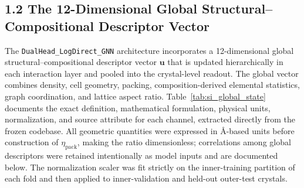 \documentclass[journal,article,submit,moreauthors,pdftex]{article}
\begin{document}
\subsection*{1.2 The 12-Dimensional Global Structural--Compositional Descriptor Vector}
The \texttt{DualHead\_LogDirect\_GNN} architecture incorporates a 12-dimensional global structural--compositional descriptor vector $\mathbf{u}$ that is updated hierarchically in each interaction layer and pooled into the crystal-level readout. The global vector combines density, cell geometry, packing, composition-derived elemental statistics, graph coordination, and lattice aspect ratio. Table~\ref{tab:si_global_state} documents the exact definition, mathematical formulation, physical units, normalization, and source attribute for each channel, extracted directly from the frozen codebase. All geometric quantities were expressed in \AA-based units before construction of $\eta_{\mathrm{pack}}$, making the ratio dimensionless; correlations among global descriptors were retained intentionally as model inputs and are documented below. The normalization scaler was fit strictly on the inner-training partition of each fold and then applied to inner-validation and held-out outer-test crystals.
\end{document}
